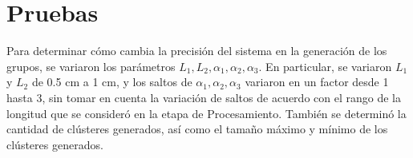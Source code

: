 \section{Pruebas}

Para determinar cómo cambia la precisión del sistema en la generación de los grupos, se variaron los parámetros $L_1, L_2, \alpha_1, \alpha_2, \alpha_3$. En particular, se variaron $L_1$ y $L_2$ de 0.5 cm a 1 cm, y los saltos de $\alpha_1, \alpha_2, \alpha_3$ variaron en un factor desde 1 hasta 3, sin tomar en cuenta la variación de saltos de acuerdo con el rango de la longitud que se consideró en la etapa de Procesamiento. También se determinó la cantidad de clústeres generados, así como el tamaño máximo y mínimo de los clústeres generados.